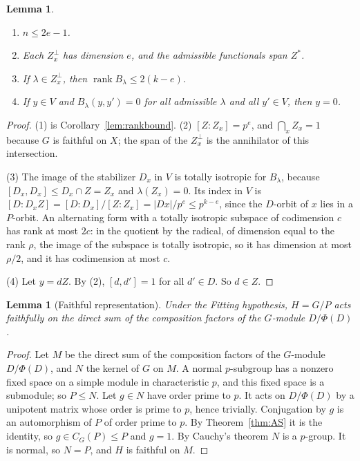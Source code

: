 \documentclass[11pt]{amsart}
\newtheorem{lemma}[theorem]{Lemma}
\theoremstyle{definition}
\theoremstyle{remark}
\newcommand{\rank}{\operatorname{rank}}
\begin{document}
\begin{lemma}\label{lem:forms}\leavevmode
\begin{enumerate}
\item $n\le2e-1$.
\item Each $Z_x^\perp$ has dimension $e$, and the admissible functionals span $Z^*$.
\item If $\lambda\in Z_x^\perp$, then $\rank B_\lambda\le2(k-e)$.
\item If $y\in V$ and $B_\lambda(y,y')=0$ for all admissible $\lambda$ and all $y'\in V$, then $y=0$.
\end{enumerate}
\end{lemma}
\begin{proof}
(1) is Corollary~\ref{lem:rankbound}. (2) $[Z:Z_x]=p^e$, and $\bigcap_xZ_x=1$ because $G$ is faithful on $X$; the span of the $Z_x^\perp$ is the annihilator of this intersection.

(3) The image of the stabilizer $D_x$ in $V$ is totally isotropic for $B_\lambda$, because $[D_x,D_x]\le D_x\cap Z=Z_x$ and $\lambda(Z_x)=0$. Its index in $V$ is $[D:D_xZ]=[D:D_x]/[Z:Z_x]=|Dx|/p^e\le p^{k-e}$, since the $D$-orbit of $x$ lies in a $P$-orbit. An alternating form with a totally isotropic subspace of codimension $c$ has rank at most $2c$: in the quotient by the radical, of dimension equal to the rank $\rho$, the image of the subspace is totally isotropic, so it has dimension at most $\rho/2$, and it has codimension at most $c$.

(4) Let $y=dZ$. By (2), $[d,d']=1$ for all $d'\in D$. So $d\in Z$.
\end{proof}

\begin{lemma}[Faithful representation]\label{thm:rep}
Under the Fitting hypothesis, $H=G/P$ acts faithfully on the direct sum of the composition factors of the $G$-module $D/\Phi(D)$.
\end{lemma}
\begin{proof}
Let $M$ be the direct sum of the composition factors of the $G$-module $D/\Phi(D)$, and $N$ the kernel of $G$ on $M$. A normal $p$-subgroup has a nonzero fixed space on a simple module in characteristic $p$, and this fixed space is a submodule; so $P\le N$. Let $g\in N$ have order prime to $p$. It acts on $D/\Phi(D)$ by a unipotent matrix whose order is prime to $p$, hence trivially. Conjugation by $g$ is an automorphism of $P$ of order prime to $p$. By Theorem~\ref{thm:AS} it is the identity, so $g\in C_G(P)\le P$ and $g=1$. By Cauchy's theorem $N$ is a $p$-group. It is normal, so $N=P$, and $H$ is faithful on $M$.
\end{proof}
\end{document}
